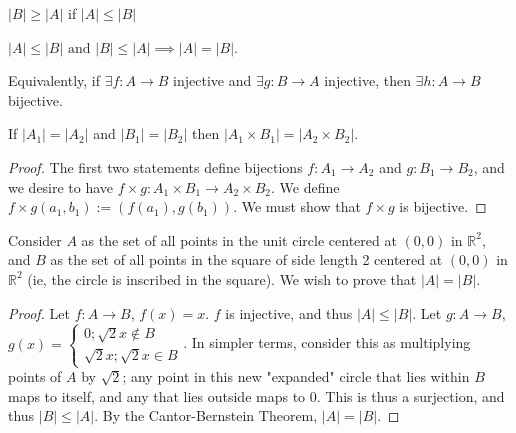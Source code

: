 \documentclass[12pt,oneside]{article}
\begin{document}
\begin{proposition}
  $|B|\geq |A|$ if $|A|\leq |B|$
\end{proposition}

\begin{theorem}
  $|A| \leq |B| \text{ and } |B| \leq |A| \implies |A| = |B|$.
  \footnotemark

  Equivalently, if $\exists f: A \to B$ injective and $\exists g: B \to A$ injective, then $\exists h: A \to B$ bijective.
\end{theorem}

\begin{proposition}
  If $|A_1|=|A_2|$ and $|B_1|=|B_2|$ then $|A_1 \times B_1| = |A_2 \times B_2|$.
\end{proposition}
\begin{proof}
  The first two statements define bijections $f: A_1 \to A_2$ and $g: B_1 \to B_2$, and we desire to have $f \times g:  A_1 \times B_1 \to A_2 \times B_2$. We define $f\times g(a_1, b_1) := (f(a_1), g(b_1))$. We must show that $f \times g$ is bijective.
\end{proof}

\begin{example}
  Consider $A$ as the set of all points in the unit circle centered at $(0,0)$ in $\mathbb{R}^2$, and $B$ as the set of all points in the square of side length 2 centered at $(0,0)$ in $\mathbb{R}^2$ (ie, the circle is inscribed in the square). We wish to prove that $|A|=|B|$.
  \begin{proof}
    Let $f: A \to B$, $f(x) = x$. $f$ is injective, and thus $|A|\leq|B|$. 
    Let $g: A \to B$, $g(x) = \begin{cases}
      0; \sqrt{2}x \notin B\\
      \sqrt{2}x; \sqrt{2}x \in B
    \end{cases}$. In simpler terms, consider this as multiplying points of $A$ by $\sqrt{2}$; any point in this new "expanded" circle that lies within $B$ maps to itself, and any that lies outside maps to 0. This is thus a surjection, and thus $|B| \leq |A|$. By the Cantor-Bernstein Theorem, $|A|=|B|$.
  \end{proof}
\end{example}
\end{document}

